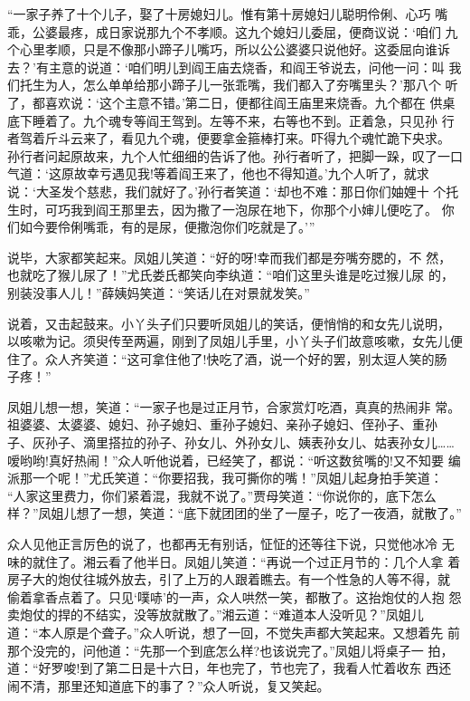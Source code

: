 “一家子养了十个儿子，娶了十房媳妇儿。惟有第十房媳妇儿聪明伶俐、心巧
嘴乖，公婆最疼，成日家说那九个不孝顺。这九个媳妇儿委屈，便商议说：‘咱们
九个心里孝顺，只是不像那小蹄子儿嘴巧，所以公公婆婆只说他好。这委屈向谁诉
去？’有主意的说道：‘咱们明儿到阎王庙去烧香，和阎王爷说去，问他一问：叫
我们托生为人，怎么单单给那小蹄子儿一张乖嘴，我们都入了夯嘴里头？’那八个
听了，都喜欢说：‘这个主意不错。’第二日，便都往阎王庙里来烧香。九个都在
供桌底下睡着了。九个魂专等阎王驾到。左等不来，右等也不到。正着急，只见孙
行者驾着斤斗云来了，看见九个魂，便要拿金箍棒打来。吓得九个魂忙跪下央求。
孙行者问起原故来，九个人忙细细的告诉了他。孙行者听了，把脚一跺，叹了一口
气道：‘这原故幸亏遇见我!等着阎王来了，他也不得知道。’九个人听了，就求
说：‘大圣发个慈悲，我们就好了。’孙行者笑道：‘却也不难：那日你们妯娌十
个托生时，可巧我到阎王那里去，因为撒了一泡尿在地下，你那个小婶儿便吃了。
你们如今要伶俐嘴乖，有的是尿，便撒泡你们吃就是了。’”

说毕，大家都笑起来。凤姐儿笑道：“好的呀!幸而我们都是夯嘴夯腮的，不
然，也就吃了猴儿尿了！”尤氏娄氏都笑向李纨道：“咱们这里头谁是吃过猴儿尿
的，别装没事人儿！”薛姨妈笑道：“笑话儿在对景就发笑。”

说着，又击起鼓来。小丫头子们只要听凤姐儿的笑话，便悄悄的和女先儿说明，
以咳嗽为记。须臾传至两遍，刚到了凤姐儿手里，小丫头子们故意咳嗽，女先儿便
住了。众人齐笑道：“这可拿住他了!快吃了酒，说一个好的罢，别太逗人笑的肠
子疼！”

凤姐儿想一想，笑道：“一家子也是过正月节，合家赏灯吃酒，真真的热闹非
常。祖婆婆、太婆婆、媳妇、孙子媳妇、重孙子媳妇、亲孙子媳妇、侄孙子、重孙
子、灰孙子、滴里搭拉的孙子、孙女儿、外孙女儿、姨表孙女儿、姑表孙女儿……
嗳哟哟!真好热闹！”众人听他说着，已经笑了，都说：“听这数贫嘴的!又不知要
编派那一个呢！”尤氏笑道：“你要招我，我可撕你的嘴！”凤姐儿起身拍手笑道：
“人家这里费力，你们紧着混，我就不说了。”贾母笑道：“你说你的，底下怎么
样？”凤姐儿想了一想，笑道：“底下就团团的坐了一屋子，吃了一夜酒，就散了。”

众人见他正言厉色的说了，也都再无有别话，怔怔的还等往下说，只觉他冰冷
无味的就住了。湘云看了他半日。凤姐儿笑道：“再说一个过正月节的：几个人拿
着房子大的炮仗往城外放去，引了上万的人跟着瞧去。有一个性急的人等不得，就
偷着拿香点着了。只见‘噗哧’的一声，众人哄然一笑，都散了。这抬炮仗的人抱
怨卖炮仗的捍的不结实，没等放就散了。”湘云道：“难道本人没听见？”凤姐儿
道：“本人原是个聋子。”众人听说，想了一回，不觉失声都大笑起来。又想着先
前那个没完的，问他道：“先那一个到底怎么样?也该说完了。”凤姐儿将桌子一
拍，道：“好罗唆!到了第二日是十六日，年也完了，节也完了，我看人忙着收东
西还闹不清，那里还知道底下的事了？”众人听说，复又笑起。

